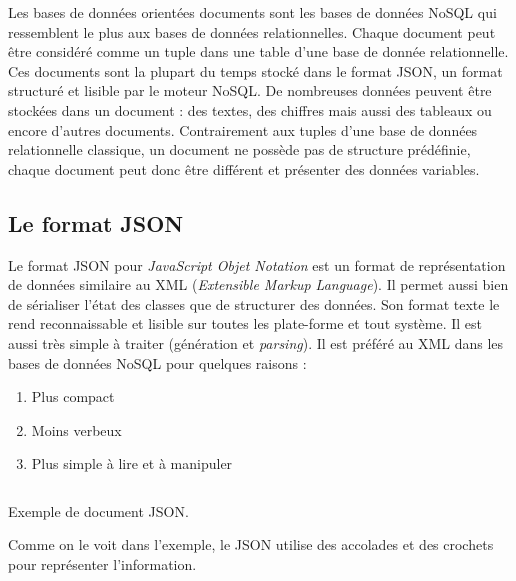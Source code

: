 Les bases de données orientées documents sont les bases de données NoSQL qui ressemblent le plus aux bases de données relationnelles. Chaque document peut être considéré comme un tuple dans une table d'une base de donnée relationnelle. Ces documents sont la plupart du temps stocké dans le format JSON, un format structuré et lisible par le moteur NoSQL. De nombreuses données peuvent être stockées dans un document : des textes, des chiffres mais aussi des tableaux ou encore d'autres documents. Contrairement aux tuples d'une base de données relationnelle classique, un document ne possède pas de structure prédéfinie, chaque document peut donc être différent et présenter des données variables.

\subsection{Le format JSON}

  Le format JSON pour \textit{JavaScript Objet Notation} est un format de représentation de données similaire au XML (\textit{Extensible Markup Language}). Il permet aussi bien de sérialiser l'état des classes que de structurer des données. Son format texte le rend reconnaissable et lisible sur toutes les plate-forme et tout système. Il est aussi très simple à traiter (génération et \textit{parsing}). Il est préféré au XML dans les bases de données NoSQL pour quelques raisons :
\begin{enumerate}
  \item Plus compact
  \item Moins verbeux
  \item Plus simple à lire et à manipuler
\end{enumerate}

\begin{listing}[H]
  \inputminted{json}{code/commentaire.json}
  \caption{Exemple de document JSON.}
\end{listing}

  Comme on le voit dans l'exemple, le JSON utilise des accolades et des crochets pour représenter l'information.
